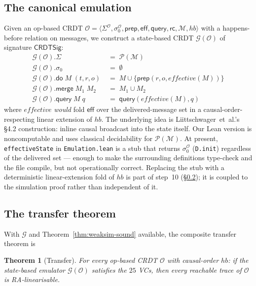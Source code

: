 \documentclass[11pt,a4paper]{article}
\newtheorem{theorem}{Theorem}[section]
\theoremstyle{definition}
\theoremstyle{remark}
\newcommand{\mdo}{\mathsf{do}}
\newcommand{\mmerge}{\mathsf{merge}}
\newcommand{\meff}{\mathsf{eff}}
\newcommand{\mquery}{\mathsf{query}}
\newcommand{\mrc}{\mathsf{rc}}
\newcommand{\mprep}{\mathsf{prep}}
\newcommand{\State}{\Sigma}
\newcommand{\init}{\sigma_0}
\newcommand{\Msg}{\mathcal{M}}
\newcommand{\Emul}{\mathcal{G}}
\begin{document}
\subsection{The canonical emulation}
\label{sec:canonical-G}

Given an op-based CRDT
$\mathcal{O} = \langle \State^{\mathcal{O}}, \sigma_0^{\mathcal{O}},
\mprep, \meff, \mquery, \mrc, \Msg, \mathit{hb}\rangle$ with a
happens-before relation on messages, we construct a state-based CRDT
$\Emul(\mathcal{O})$ of signature $\mathsf{CRDTSig}$:
\begin{align*}
  \Emul(\mathcal{O}).\State &\;=\; \mathcal{P}(\Msg) \\
  \Emul(\mathcal{O}).\init &\;=\; \emptyset \\
  \Emul(\mathcal{O}).\mdo\;M\;(t, r, o) &\;=\; M \cup \{\mprep(r, o, \mathit{effective}(M))\} \\
  \Emul(\mathcal{O}).\mmerge\;M_1\;M_2 &\;=\; M_1 \cup M_2 \\
  \Emul(\mathcal{O}).\mquery\;M\;q &\;=\; \mquery(\mathit{effective}(M), q)
\end{align*}
where $\mathit{effective}$ \emph{would} fold $\meff$ over the
delivered-message set in a causal-order-respecting linear extension
of $\mathit{hb}$. The underlying idea is Liittschwager~et~al.'s §4.2
construction: inline causal broadcast into the state itself. Our
Lean version is noncomputable and uses classical decidability for
$\mathcal{P}(\Msg)$. At present, \texttt{effectiveState} in
\texttt{Emulation.lean} is a stub that returns $\sigma_0^{\mathcal{O}}$
(\texttt{D.init}) regardless of the delivered set --- enough to make
the surrounding definitions type-check and the file compile, but not
operationally correct. Replacing the stub with a deterministic
linear-extension fold of $\mathit{hb}$ is part of step~10
(\S\ref{sec:transfer}); it is coupled to the simulation proof rather
than independent of it.

\subsection{The transfer theorem}
\label{sec:transfer}

With $\Emul$ and Theorem~\ref{thm:weaksim-sound} available, the
composite transfer theorem is
\begin{theorem}[Transfer]
\label{thm:transfer}
For every op-based CRDT $\mathcal{O}$ with causal-order
$\mathit{hb}$: if the state-based emulator $\Emul(\mathcal{O})$
satisfies the $25$ VCs, then every reachable trace of $\mathcal{O}$
is RA-linearisable.
\end{theorem}
\end{document}
